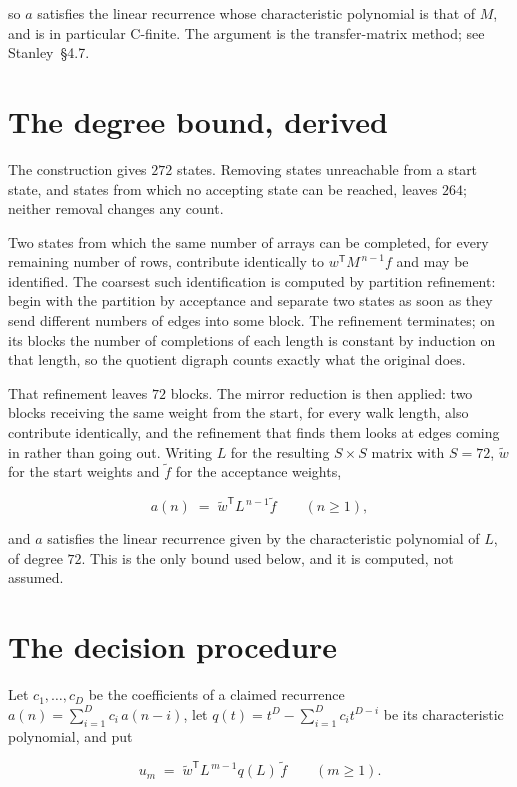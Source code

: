 \documentclass[11pt]{article}
\theoremstyle{definition}
\begin{document}
so $a$ satisfies the linear recurrence whose characteristic polynomial is that of $M$, and is in particular C-finite. The argument is the transfer-matrix method; see Stanley~\S4.7.

\section{The degree bound, derived}

The construction gives $272$ states. Removing states unreachable from a start state, and states from which no accepting state can be reached, leaves $264$; neither removal changes any count.

Two states from which the same number of arrays can be completed, for every remaining number of rows, contribute identically to $w^{\mathsf T}M^{\,n-1}f$ and may be identified. The coarsest such identification is computed by partition refinement: begin with the partition by acceptance and separate two states as soon as they send different numbers of edges into some block. The refinement terminates; on its blocks the number of completions of each length is constant by induction on that length, so the quotient digraph counts exactly what the original does.

That refinement leaves $72$ blocks. The mirror reduction is then applied: two blocks receiving the same weight from the start, for every walk length, also contribute identically, and the refinement that finds them looks at edges coming in rather than going out. Writing $L$ for the resulting $S \times S$ matrix with $S = 72$, $\tilde w$ for the start weights and $\tilde f$ for the acceptance weights,

\[a(n) \;=\; \tilde w^{\mathsf T} L^{\,n-1} \tilde f \qquad (n \ge 1),\]

and $a$ satisfies the linear recurrence given by the characteristic polynomial of $L$, of degree $72$. This is the only bound used below, and it is computed, not assumed.

\section{The decision procedure}

Let $c_1,\dots,c_D$ be the coefficients of a claimed recurrence $a(n) = \sum_{i=1}^{D} c_i\,a(n-i)$, let $q(t) = t^{D} - \sum_{i=1}^{D} c_i t^{D-i}$ be its characteristic polynomial, and put

\[u_m \;=\; \tilde w^{\mathsf T} L^{\,m-1} q(L)\,\tilde f \qquad (m \ge 1).\]
\end{document}
